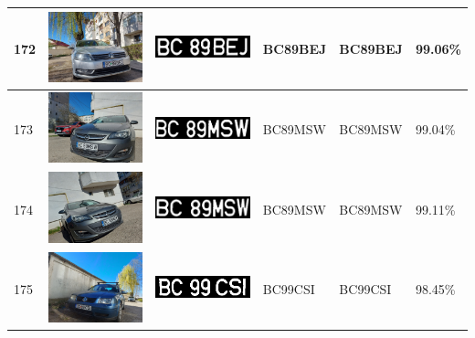 \documentclass[a4paper,12pt]{report}
\begin{document}
\begin{longtable}{| m{0.6cm} | m{3cm} | m{3cm} | m{1.8cm} | m{1.8cm} | m{1.8cm} |}
    172 & \includegraphics[width=3cm,keepaspectratio]{dataset/107_s1.jpg} & \includegraphics[width=3cm,keepaspectratio]{segmentari/172.jpg} & BC89BEJ             & BC89BEJ              & 99.06\%    \\ \hline
    173 & \includegraphics[width=3cm,keepaspectratio]{dataset/108_d1.jpg} & \includegraphics[width=3cm,keepaspectratio]{segmentari/173.jpg} & BC89MSW             & BC89MSW              & 99.04\%    \\ \hline
    174 & \includegraphics[width=3cm,keepaspectratio]{dataset/108_s1.jpg} & \includegraphics[width=3cm,keepaspectratio]{segmentari/174.jpg} & BC89MSW             & BC89MSW              & 99.11\%    \\ \hline
    175 & \includegraphics[width=3cm,keepaspectratio]{dataset/109_d1.jpg} & \includegraphics[width=3cm,keepaspectratio]{segmentari/175.jpg} & BC99CSI             & BC99CSI              & 98.45\%    \\ \hline

\end{longtable}
\end{document}
